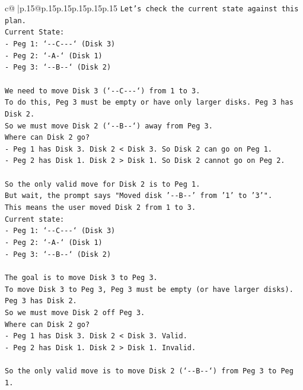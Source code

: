 \documentclass{article}
\begin{document}
{\begin{supertabular}{c@{$\;$}|p{.15\linewidth}@{}p{.15\linewidth}p{.15\linewidth}p{.15\linewidth}p{.15\linewidth}p{.15\linewidth}}
{{{\texttt{Let's check the current state against this plan.} \\
\texttt{Current State:} \\
\texttt{{-} Peg 1: `{-}{-}C{-}{-}{-}` (Disk 3)} \\
\texttt{{-} Peg 2: `{-}A{-}` (Disk 1)} \\
\texttt{{-} Peg 3: `{-}{-}B{-}{-}` (Disk 2)} \\
\\ 
\texttt{We need to move Disk 3 (`{-}{-}C{-}{-}{-}`) from 1 to 3.} \\
\texttt{To do this, Peg 3 must be empty or have only larger disks. Peg 3 has Disk 2.} \\
\texttt{So we must move Disk 2 (`{-}{-}B{-}{-}`) away from Peg 3.} \\
\texttt{Where can Disk 2 go?} \\
\texttt{{-} Peg 1 has Disk 3. Disk 2 < Disk 3. So Disk 2 can go on Peg 1.} \\
\texttt{{-} Peg 2 has Disk 1. Disk 2 > Disk 1. So Disk 2 cannot go on Peg 2.} \\
\\ 
\texttt{So the only valid move for Disk 2 is to Peg 1.} \\
\texttt{But wait, the prompt says "Moved disk '{-}{-}B{-}{-}' from '1' to '3'".} \\
\texttt{This means the user moved Disk 2 from 1 to 3.} \\
\texttt{Current state:} \\
\texttt{{-} Peg 1: `{-}{-}C{-}{-}{-}` (Disk 3)} \\
\texttt{{-} Peg 2: `{-}A{-}` (Disk 1)} \\
\texttt{{-} Peg 3: `{-}{-}B{-}{-}` (Disk 2)} \\
\\ 
\texttt{The goal is to move Disk 3 to Peg 3.} \\
\texttt{To move Disk 3 to Peg 3, Peg 3 must be empty (or have larger disks).} \\
\texttt{Peg 3 has Disk 2.} \\
\texttt{So we must move Disk 2 off Peg 3.} \\
\texttt{Where can Disk 2 go?} \\
\texttt{{-} Peg 1 has Disk 3. Disk 2 < Disk 3. Valid.} \\
\texttt{{-} Peg 2 has Disk 1. Disk 2 > Disk 1. Invalid.} \\
\\ 
\texttt{So the only valid move is to move Disk 2 (`{-}{-}B{-}{-}`) from Peg 3 to Peg 1.} \\
}}}
\end{supertabular}}
\end{document}
